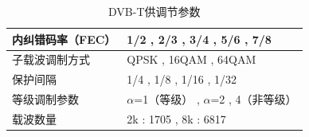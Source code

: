 		\begin{table}[!htbp]
			\centering
			\caption{DVB-T供调节参数}
			\begin{tabular}{|l|p{}|}
				\hline\hline
				内纠错码率（FEC） & 1/2 , 2/3 , 3/4 , 5/6 , 7/8                            \\
				\hline
				子载波调制方式    & QPSK , 16QAM , 64QAM                                   \\
				\hline
				保护间隔             & 1/4 , 1/8 , 1/16 , 1/32                                \\
				\hline
				等级调制参数       & $\alpha$=1（等级） , $\alpha$=2 , 4（非等级） \\
				\hline
				载波数量             & 2k : 1705 , 8k : 6817                                  \\
				\hline\hline
			\end{tabular}
			\label{table:params_of_dvbt}
		\end{table}
		\endinput